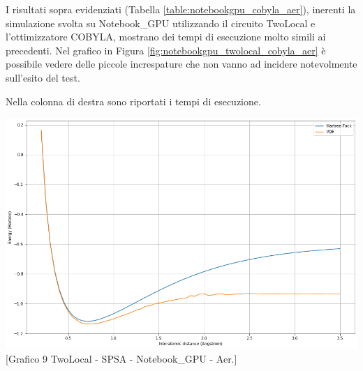 I risultati sopra evidenziati (Tabella \ref{table:notebookgpu_cobyla_aer}), inerenti la simulazione svolta su Notebook\_GPU utilizzando il circuito TwoLocal e l'ottimizzatore COBYLA, mostrano dei tempi di esecuzione molto simili ai precedenti. Nel grafico in Figura \ref{fig:notebookgpu_twolocal_cobyla_aer} è possibile vedere delle piccole increspature che non vanno ad incidere notevolmente sull'esito del test.
\newline
\begin{minipage}[b]{0.39\textwidth}
    \captionsetup{type=table}
    \caption[Risultati simulazione SPSA.]{Nella colonna di destra sono riportati i tempi di esecuzione.}
    \label{table:notebookgpu_spsa_aer}
\end{minipage}
\hfill
\begin{minipage}[b]{0.57\textwidth}
    \centering
    \includegraphics[width=1.0\textwidth]{Images/Capitolo3/Plots/H2_twolocal_ry_rz_cz_spsa_aer_gpu_plot.png}
    [Grafico 9 \newline TwoLocal - SPSA - Notebook\_GPU - Aer.]{}
    \label{fig:notebookgpu_twolocal_spsa_aer}
\end{minipage}

